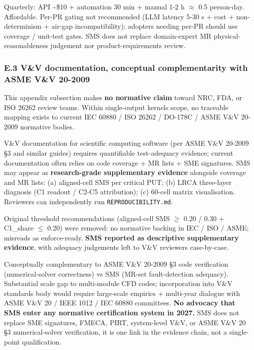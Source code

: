 \documentclass[review,12pt,authoryear]{elsarticle}
\begin{document}
Quarterly: API \textasciitilde\$10 + automation 30 min + manual 1-2 h $\approx$
0.5 person-day. Affordable. Per-PR gating not recommended (LLM latency
5-30 s + cost + non-determinism + air-gap incompatibility); adopters
needing per-PR should use coverage / unit-test gates. SMS does not
replace domain-expert MR physical-reasonableness judgement nor
product-requirements review.

\subsubsection{E.3 V\&V documentation, conceptual complementarity with ASME V\&V 20-2009}\label{e.3-vv-documentation-conceptual-complementarity-with-asme-vv-20-2009}

This appendix subsection makes \textbf{no normative claim} toward NRC,
FDA, or ISO 26262 review teams. Within single-output kernels scope, no
traceable mapping exists to current IEC 60880 / ISO 26262 / DO-178C /
ASME V\&V 20-2009 normative bodies.

V\&V documentation for scientific computing software (per ASME V\&V
20-2009 §3 and similar guides) requires quantifiable test-adequacy
evidence; current documentation often relies on code coverage + MR lists
+ SME signatures. SMS may appear as \textbf{research-grade supplementary
evidence} alongside coverage and MR lists: (a) aligned-cell SMS per
critical PUT; (b) LRCA three-layer diagnosis (C1 readout / C2-C5
attribution); (c) 60-cell matrix visualisation. Reviewers can
independently run \texttt{REPRODUCIBILITY.md}.

Original threshold recommendations (aligned-cell SMS $\geq$ 0.20 / 0.30 +
C1\_share $\leq$ 0.20) were removed: no normative backing in IEC / ISO /
ASME; misreads as enforce-ready. \textbf{SMS reported as descriptive
supplementary evidence}, with adequacy judgements left to V\&V reviewers
case-by-case.

Conceptually complementary to ASME V\&V 20-2009 §3 code verification
(numerical-solver correctness) vs SMS (MR-set fault-detection adequacy).
Substantial scale gap to multi-module CFD codes; incorporation into V\&V
standards body would require large-scale empirics + multi-year
dialogue with ASME V\&V 20 / IEEE 1012 / IEC 60880 committees.
\textbf{No advocacy that SMS enter any normative certification system in
2027.} SMS does not replace SME signatures, FMECA, PIRT, system-level
V\&V, or ASME V\&V 20 §3 numerical-solver verification, it is one
link in the evidence chain, not a single-point qualification.
\end{document}
